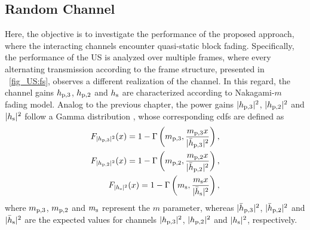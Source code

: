 



\subsection{Random Channel}\label{ssec_US:ltpa}
Here, the objective is to investigate the performance of the proposed approach, where the interacting channels encounter quasi-static block fading. Specifically, the performance of the US is analyzed over multiple frames, where every alternating transmission according to the frame structure, presented in \figurename~\ref{fig_US:fs}, observes a different realization of the channel. In this regard, the channel gains $h_{\text{p,3}}$, $h_{\text{p,2}}$ and $h_{\text{s}}$ are characterized according to Nakagami-$m$ fading model. Analog to the previous chapter, the power gains $|h_{\text{p,3}}|^2$, $|h_{\text{p,2}}|^2$ and $|h_{\text{s}}|^2$ follow a Gamma distribution \cite{Goldsmith05}, whose corresponding cdfs are defined as  
\begin{align}
F_{|h_{\text{p,3}}|^2}(x) = 1 - \Gamma\left(m_{\text{p,3}}, \frac{m_{\text{p,3}} x}{|\bar{h}_{\text{p,3}}|^2}\right), \label{eq_US:dis_pgpth}\\
F_{|h_{\text{p,2}}|^2}(x) = 1 - \Gamma\left(m_{\text{p,2}}, \frac{m_{\text{p,2}} x}{|\bar{h}_{\text{p,2}}|^2}\right), \label{eq_US:dis_pgpt}\\  
F_{|h_{\text{s}}|^2}(x) = 1 - \Gamma\left(m_{\text{s}} , \frac{m_{\text{s}} x}{|\bar{h}_{\text{s}}|^2}\right), \label{eq_US:dis_pgs}
\end{align}
where $m_{\text{p,3}}$, $m_{\text{p,2}}$ and $m_{\text{s}}$ represent the $m$ parameter, whereas $|\bar{h}_{\text{p,3}}|^2$, $|\bar{h}_{\text{p,2}}|^2$ and $|\bar{h}_{\text{s}}|^2$ are the expected values for channels $|h_{\text{p,3}}|^2$, $|h_{\text{p,2}}|^2$ and $|h_{\text{s}}|^2$, respectively. %
